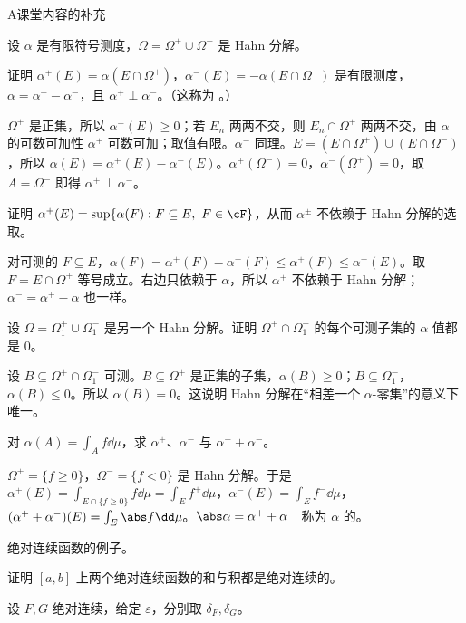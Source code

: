 \begin{exercises}{A}{课堂内容的补充}
\item\label{ex:ac:A7} 设 $\alpha$ 是有限符号测度，$\Omega=\Omega^+\cup\Omega^-$ 是 Hahn 分解。
\begin{questions}
\item 证明 $\alpha^+(E)=\alpha(E\cap\Omega^+)$，$\alpha^-(E)=-\alpha(E\cap\Omega^-)$ 是有限测度，$\alpha=\alpha^+-\alpha^-$，且 $\alpha^+\perp\alpha^-$。（这称为 。）
\begin{solution}
$\Omega^+$ 是正集，所以 $\alpha^+(E)\geqslant0$；若 $E_n$ 两两不交，则 $E_n\cap\Omega^+$ 两两不交，由 $\alpha$ 的可数可加性 $\alpha^+$ 可数可加；取值有限。$\alpha^-$ 同理。$E=(E\cap\Omega^+)\cup(E\cap\Omega^-)$，所以 $\alpha(E)=\alpha^+(E)-\alpha^-(E)$。$\alpha^+(\Omega^-)=0$，$\alpha^-(\Omega^+)=0$，取 $A=\Omega^-$ 即得 $\alpha^+\perp\alpha^-$。
\end{solution}
\item 证明 $\alpha^+(E)=\sup\{\alpha(F):F\subseteq E,\ F\in\cF\}$，从而 $\alpha^\pm$ 不依赖于 Hahn 分解的选取。
\begin{solution}
对可测的 $F\subseteq E$，$\alpha(F)=\alpha^+(F)-\alpha^-(F)\leqslant\alpha^+(F)\leqslant\alpha^+(E)$。取 $F=E\cap\Omega^+$ 等号成立。右边只依赖于 $\alpha$，所以 $\alpha^+$ 不依赖于 Hahn 分解；$\alpha^-=\alpha^+-\alpha$ 也一样。
\end{solution}
\item 设 $\Omega=\Omega_1^+\cup\Omega_1^-$ 是另一个 Hahn 分解。证明 $\Omega^+\cap\Omega_1^-$ 的每个可测子集的 $\alpha$ 值都是 $0$。
\begin{solution}
设 $B\subseteq\Omega^+\cap\Omega_1^-$ 可测。$B\subseteq\Omega^+$ 是正集的子集，$\alpha(B)\geqslant0$；$B\subseteq\Omega_1^-$，$\alpha(B)\leqslant0$。所以 $\alpha(B)=0$。这说明 Hahn 分解在“相差一个 $\alpha$-零集”的意义下唯一。
\end{solution}
\item 对 $\alpha(A)=\int_Af\dd\mu$，求 $\alpha^+$、$\alpha^-$ 与 $\alpha^++\alpha^-$。
\begin{solution}
$\Omega^+=\{f\geqslant0\}$，$\Omega^-=\{f<0\}$ 是 Hahn 分解。于是 $\alpha^+(E)=\int_{E\cap\{f\geqslant0\}}f\dd\mu=\int_Ef^+\dd\mu$，$\alpha^-(E)=\int_Ef^-\dd\mu$，$(\alpha^++\alpha^-)(E)=\int_E\abs f\dd\mu$。$\abs\alpha=\alpha^++\alpha^-$ 称为 $\alpha$ 的。
\end{solution}
\end{questions}

\item\label{ex:ac:A8} 绝对连续函数的例子。
\begin{questions}
\item 证明 $[a,b]$ 上两个绝对连续函数的和与积都是绝对连续的。
\begin{solution}
设 $F,G$ 绝对连续，给定 $\varepsilon$，分别取 $\delta_F,\delta_G$。


\end{solution}
\end{questions}
\end{exercises}

